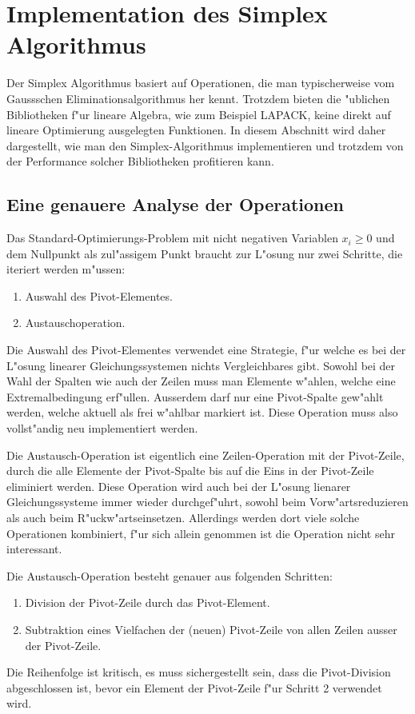 \chapter{Implementation des Simplex Algorithmus}

Der Simplex Algorithmus basiert auf Operationen, die man typischerweise
vom Gauss\-schen Eliminationsalgorithmus her kennt.
Trotzdem bieten die "ublichen Bibliotheken f"ur lineare Algebra,
wie zum Beispiel LAPACK, keine direkt auf lineare Optimierung
ausgelegten Funktionen.
In diesem Abschnitt wird daher dargestellt, wie man den Simplex-Algorithmus
implementieren und trotzdem von der Performance solcher
Bibliotheken profitieren kann.

\section{Eine genauere Analyse der Operationen}
Das Standard-Optimierungs-Problem mit nicht negativen Variablen $x_i\ge 0$
und dem Nullpunkt als zul"assigem Punkt braucht zur L"osung nur zwei Schritte,
die iteriert werden m"ussen:
\begin{enumerate}
\item Auswahl des Pivot-Elementes.
\item Austauschoperation.
\end{enumerate}
Die Auswahl des Pivot-Elementes verwendet eine Strategie, f"ur welche es
bei der L"osung linearer Gleichungssystemen nichts Vergleichbares gibt.
Sowohl bei der Wahl der Spalten wie auch der Zeilen muss man Elemente 
w"ahlen, welche eine Extremalbedingung erf"ullen. Ausserdem
darf nur eine Pivot-Spalte gew"ahlt werden, welche aktuell als
frei w"ahlbar markiert ist. Diese Operation muss also vollst"andig neu
implementiert werden.

Die Austausch-Operation ist eigentlich eine Zeilen-Operation mit der
Pivot-Zeile, durch die alle Elemente der Pivot-Spalte bis auf die Eins
in der Pivot-Zeile eliminiert werden. Diese Operation wird auch
bei der L"osung lienarer Gleichungssysteme immer wieder durchgef"uhrt,
sowohl beim Vorw"artsreduzieren als auch beim R"uckw"artseinsetzen.
Allerdings werden dort viele solche Operationen kombiniert, f"ur sich
allein genommen ist die Operation nicht sehr interessant.

Die Austausch-Operation besteht genauer aus folgenden Schritten:
\begin{enumerate}
\item Division der Pivot-Zeile durch das Pivot-Element.
\item Subtraktion eines Vielfachen der (neuen) Pivot-Zeile von allen
Zeilen ausser der Pivot-Zeile.
\end{enumerate}
Die Reihenfolge ist kritisch, es muss sichergestellt sein, dass die
Pivot-Division abgeschlossen ist, bevor ein Element der Pivot-Zeile
f"ur Schritt 2 verwendet wird.

